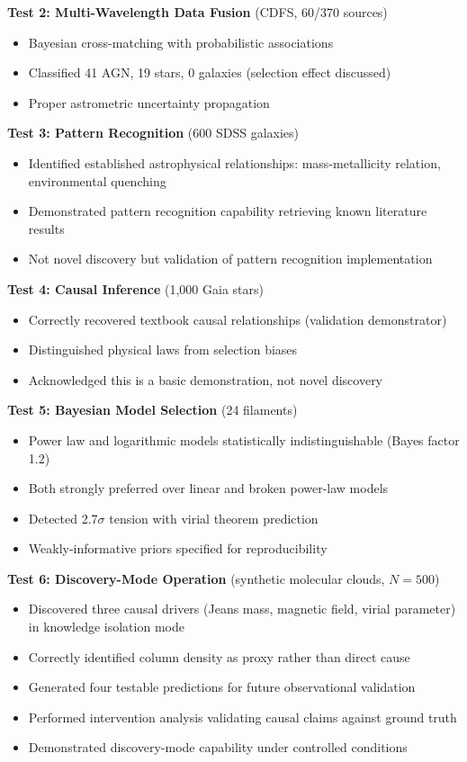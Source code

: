 \documentclass[usenatbib]{rasti}
\begin{document}
\textbf{Test 2: Multi-Wavelength Data Fusion} (CDFS, 60/370 sources)
\begin{itemize}
\item Bayesian cross-matching with probabilistic associations
\item Classified 41 AGN, 19 stars, 0 galaxies (selection effect discussed)
\item Proper astrometric uncertainty propagation
\end{itemize}

\textbf{Test 3: Pattern Recognition} (600 SDSS galaxies)
\begin{itemize}
\item Identified established astrophysical relationships: mass-metallicity relation, environmental quenching
\item Demonstrated pattern recognition capability retrieving known literature results
\item Not novel discovery but validation of pattern recognition implementation
\end{itemize}

\textbf{Test 4: Causal Inference} (1,000 Gaia stars)
\begin{itemize}
\item Correctly recovered textbook causal relationships (validation demonstrator)
\item Distinguished physical laws from selection biases
\item Acknowledged this is a basic demonstration, not novel discovery
\end{itemize}

\textbf{Test 5: Bayesian Model Selection} (24 filaments)
\begin{itemize}
\item Power law and logarithmic models statistically indistinguishable (Bayes factor 1.2)
\item Both strongly preferred over linear and broken power-law models
\item Detected 2.7$\sigma$ tension with virial theorem prediction
\item Weakly-informative priors specified for reproducibility
\end{itemize}

\textbf{Test 6: Discovery-Mode Operation} (synthetic molecular clouds, $N=500$)
\begin{itemize}
\item Discovered three causal drivers (Jeans mass, magnetic field, virial parameter) in knowledge isolation mode
\item Correctly identified column density as proxy rather than direct cause
\item Generated four testable predictions for future observational validation
\item Performed intervention analysis validating causal claims against ground truth
\item Demonstrated discovery-mode capability under controlled conditions
\end{itemize}
\end{document}
